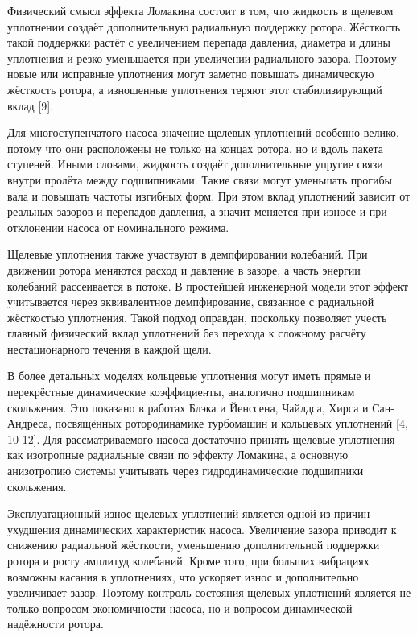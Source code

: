 Физический смысл эффекта Ломакина состоит в том, что жидкость в щелевом уплотнении создаёт дополнительную радиальную поддержку ротора. Жёсткость такой поддержки растёт с увеличением перепада давления, диаметра и длины уплотнения и резко уменьшается при увеличении радиального зазора. Поэтому новые или исправные уплотнения могут заметно повышать динамическую жёсткость ротора, а изношенные уплотнения теряют этот стабилизирующий вклад [9].

Для многоступенчатого насоса значение щелевых уплотнений особенно велико, потому что они расположены не только на концах ротора, но и вдоль пакета ступеней. Иными словами, жидкость создаёт дополнительные упругие связи внутри пролёта между подшипниками. Такие связи могут уменьшать прогибы вала и повышать частоты изгибных форм. При этом вклад уплотнений зависит от реальных зазоров и перепадов давления, а значит меняется при износе и при отклонении насоса от номинального режима.

Щелевые уплотнения также участвуют в демпфировании колебаний. При движении ротора меняются расход и давление в зазоре, а часть энергии колебаний рассеивается в потоке. В простейшей инженерной модели этот эффект учитывается через эквивалентное демпфирование, связанное с радиальной жёсткостью уплотнения. Такой подход оправдан, поскольку позволяет учесть главный физический вклад уплотнений без перехода к сложному расчёту нестационарного течения в каждой щели.

В более детальных моделях кольцевые уплотнения могут иметь прямые и перекрёстные динамические коэффициенты, аналогично подшипникам скольжения. Это показано в работах Блэка и Йенссена, Чайлдса, Хирса и Сан-Андреса, посвящённых ротородинамике турбомашин и кольцевых уплотнений [4, 10-12]. Для рассматриваемого насоса достаточно принять щелевые уплотнения как изотропные радиальные связи по эффекту Ломакина, а основную анизотропию системы учитывать через гидродинамические подшипники скольжения.

Эксплуатационный износ щелевых уплотнений является одной из причин ухудшения динамических характеристик насоса. Увеличение зазора приводит к снижению радиальной жёсткости, уменьшению дополнительной поддержки ротора и росту амплитуд колебаний. Кроме того, при больших вибрациях возможны касания в уплотнениях, что ускоряет износ и дополнительно увеличивает зазор. Поэтому контроль состояния щелевых уплотнений является не только вопросом экономичности насоса, но и вопросом динамической надёжности ротора.

